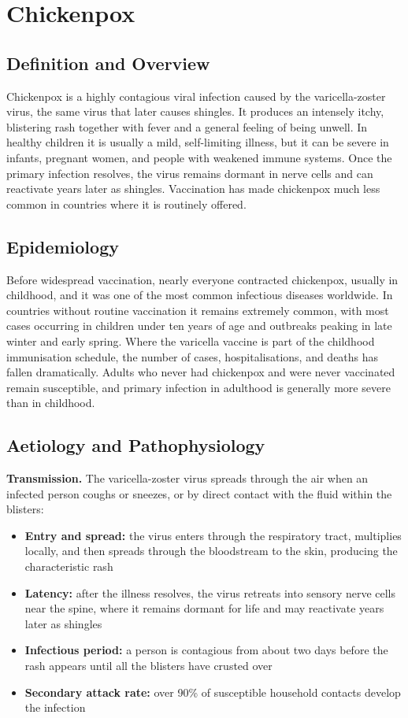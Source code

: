 \chapter{Chickenpox}

\section*{Definition and Overview}
Chickenpox is a highly contagious viral infection caused by the varicella-zoster virus, the same virus that later causes shingles. It produces an intensely itchy, blistering rash together with fever and a general feeling of being unwell. In healthy children it is usually a mild, self-limiting illness, but it can be severe in infants, pregnant women, and people with weakened immune systems. Once the primary infection resolves, the virus remains dormant in nerve cells and can reactivate years later as shingles. Vaccination has made chickenpox much less common in countries where it is routinely offered.

\section*{Epidemiology}
Before widespread vaccination, nearly everyone contracted chickenpox, usually in childhood, and it was one of the most common infectious diseases worldwide. In countries without routine vaccination it remains extremely common, with most cases occurring in children under ten years of age and outbreaks peaking in late winter and early spring. Where the varicella vaccine is part of the childhood immunisation schedule, the number of cases, hospitalisations, and deaths has fallen dramatically. Adults who never had chickenpox and were never vaccinated remain susceptible, and primary infection in adulthood is generally more severe than in childhood.

\section*{Aetiology and Pathophysiology}
\medskip
\textbf{Transmission.} The varicella-zoster virus spreads through the air when an infected person coughs or sneezes, or by direct contact with the fluid within the blisters:
\begin{itemize}
    \item \textbf{Entry and spread:} the virus enters through the respiratory tract, multiplies locally, and then spreads through the bloodstream to the skin, producing the characteristic rash
    \item \textbf{Latency:} after the illness resolves, the virus retreats into sensory nerve cells near the spine, where it remains dormant for life and may reactivate years later as shingles
    \item \textbf{Infectious period:} a person is contagious from about two days before the rash appears until all the blisters have crusted over
    \item \textbf{Secondary attack rate:} over 90\% of susceptible household contacts develop the infection
\end{itemize}


